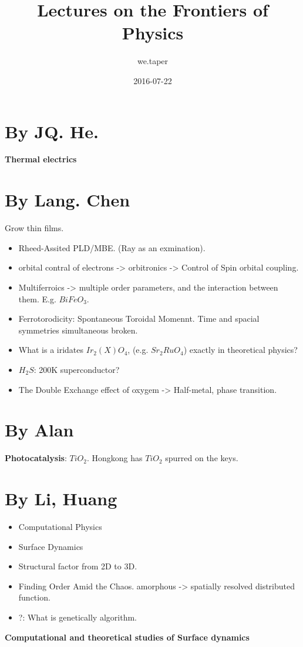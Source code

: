 \documentclass{article}
\title{Lectures on the Frontiers of Physics}
\date{2016-07-22}
\author{we.taper}
\numberwithin{equation}{subsection} %
\theoremstyle{definition}
\begin{document}
\maketitle
{}
\tableofcontents


\section{By JQ. He.}
\textbf{Thermal electrics}

\section{By Lang. Chen}
\label{sec:c.l}
Grow thin films.
\begin{itemize}
\item Rheed-Assited PLD/MBE. (Ray as an exmination).
\item 
orbital contral of electrons -> 
orbitronics -> Control of Spin orbital coupling.
\item
Multiferroics -> multiple order parameters, and the interaction
between them. E.g. $BiFeO_3$.
\item
Ferrotorodicity: Spontaneous Toroidal Momennt. Time and spacial
symmetries simultaneous broken.
\item
What is a iridates $Ir_2(X)O_4$, (e.g. $Sr_2RuO_4$) 
exactly in theoretical physics?
\item
$H_2S$: 200K superconductor?
\item
The Double Exchange effect of oxygem -> Half-metal, phase transition.
\end{itemize}

\section{By Alan}
\textbf{Photocatalysis}: $TiO_2$. Hongkong has $TiO_2$ spurred on
the keys.

\section{By Li, Huang}
\begin{itemize}
        \item Computational Physics
        \item Surface Dynamics
        \item Structural factor from 2D to 3D.
        \item Finding Order Amid the Chaos. amorphous -> spatially
                resolved distributed function.
        \item ?: What is genetically algorithm.
\end{itemize}
\textbf{Computational and theoretical studies of Surface dynamics}
\end{document}
